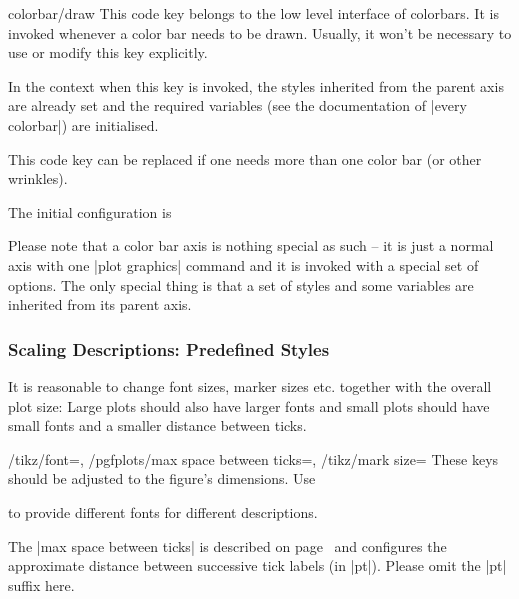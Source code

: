 \begin{pgfplotscodekey}{colorbar/draw}
	This code key belongs to the low level interface of colorbars. It is invoked whenever a color bar needs to be drawn. Usually, it won't be necessary to use or modify this key explicitly.
	
	In the context when this key is invoked, the styles inherited from the parent axis are already set and the required variables (see the documentation of |every colorbar|) are initialised.

	This code key can be replaced if one needs more than one color bar (or other wrinkles).

	The initial configuration is
\begin{codeexample}
\end{codeexample}

	Please note that a color bar axis is nothing special as such -- it is just a normal axis with one |plot graphics| command and it is invoked with a special set of options. The only special thing is that a set of styles and some variables are inherited from its parent axis.
\end{pgfplotscodekey}

\subsubsection{Scaling Descriptions: Predefined Styles}
It is reasonable to change font sizes, marker sizes etc. together with the overall plot size: Large plots should also have larger fonts and small plots should have small fonts and a smaller distance between ticks.

\begin{keylist}{
	/tikz/font=,
	/pgfplots/max space between ticks=,
	/tikz/mark size=}
	These keys should be adjusted to the figure's dimensions. Use 
\begin{codeexample}
\end{codeexample}
	to provide different fonts for different descriptions.

	The |max space between ticks| is described on page~\pageref{maxspacebetweenticks} and configures the approximate distance between successive tick labels (in |pt|). Please omit the |pt| suffix here.
\end{keylist}

